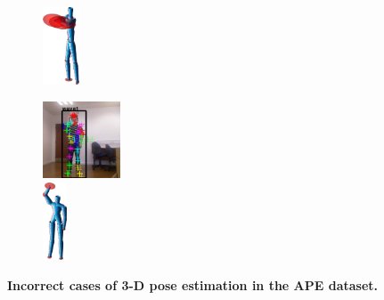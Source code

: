 \begin{figure}
\begin{subfigure}[t]{0.18\linewidth}
		\includegraphics[height=2.3cm]{fig/body/APE/boxerr2.png} 
		\label{fig/body/APEerr3}
	\end{subfigure}
	\begin{subfigure}[t]{0.18\linewidth} \centering
		\includegraphics[height=2.3cm]{fig/body/APE/wave1err.jpg} \\
		\includegraphics[height=2.3cm]{fig/body/APE/wave1err.png} 
		\label{fig/body/APEerr4}
	\end{subfigure}
	\label{fig/body/APEerr}
	\caption{\textbf{Incorrect cases of 3-D pose estimation in the APE dataset.}}
\end{figure}
